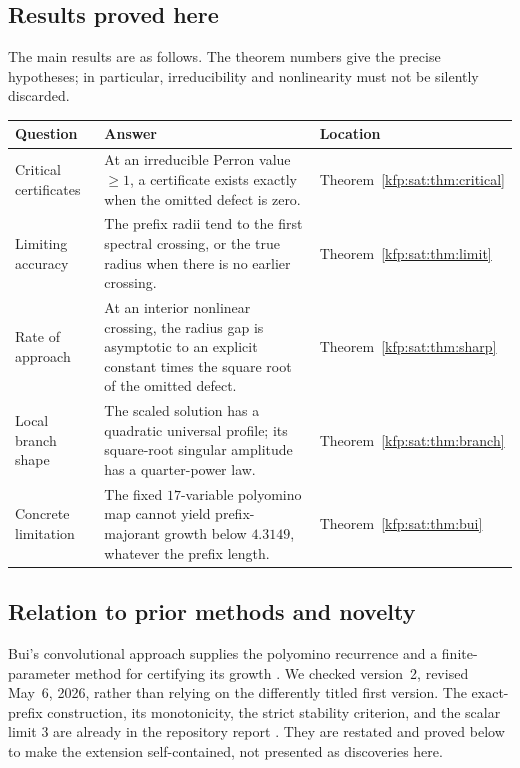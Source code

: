 \documentclass[11pt,a4paper]{article}
\theoremstyle{definition}
\theoremstyle{remark}
\begin{document}
\subsection{Results proved here}
The main results are as follows. The theorem numbers give the precise
hypotheses; in particular, irreducibility and nonlinearity must not be
silently discarded.

\begin{center}\small
\begin{tabular}{@{}p{.20\linewidth}p{.48\linewidth}p{.22\linewidth}@{}}
\toprule
Question & Answer & Location\\
\midrule
Critical certificates & At an irreducible Perron value $\ge1$, a certificate
exists exactly when the omitted defect is zero. & Theorem~\ref{kfp:sat:thm:critical}\\[4pt]
Limiting accuracy & The prefix radii tend to the first spectral crossing,
or the true radius when there is no earlier crossing. & Theorem~\ref{kfp:sat:thm:limit}\\[4pt]
Rate of approach & At an interior nonlinear crossing, the radius gap is
asymptotic to an explicit constant times the square root of the omitted
defect. & Theorem~\ref{kfp:sat:thm:sharp}\\[4pt]
Local branch shape & The scaled solution has a quadratic universal profile;
its square-root singular amplitude has a quarter-power law. &
Theorem~\ref{kfp:sat:thm:branch}\\[4pt]
Concrete limitation & The fixed $17$-variable polyomino map cannot yield
prefix-majorant growth below $4.3149$, whatever the prefix length. &
Theorem~\ref{kfp:sat:thm:bui}\\
\bottomrule
\end{tabular}
\end{center}

\subsection{Relation to prior methods and novelty}
Bui's convolutional approach supplies the polyomino recurrence and a
finite-parameter method for certifying its growth \cite{bui}. We checked
version~2, revised May~6, 2026, rather than relying on the differently
titled first version. The exact-prefix construction, its monotonicity, the
strict stability criterion, and the scalar limit $3$ are already in the
repository report \cite{satprefix}. They are restated and proved below to
make the extension self-contained, not presented as discoveries here.
\end{document}
